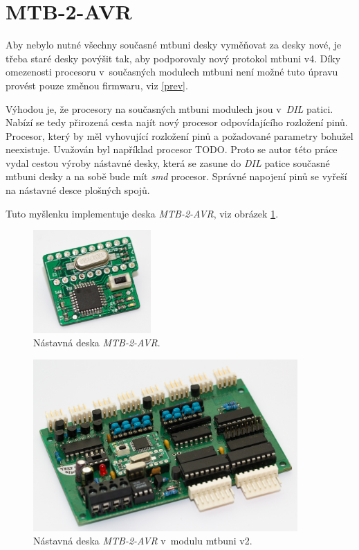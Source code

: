 \section{MTB-2-AVR} \label{sec:mtb-2-avr}

Aby nebylo nutné všechny současné \gls{mtbuni} desky vyměňovat za desky nové,
je třeba staré desky povýšit tak, aby podporovaly nový protokol \gls{mtbuni} v4.
Díky omezenosti procesoru v~současných modulech \gls{mtbuni} není možné tuto
úpravu provést pouze změnou firmwaru, viz \ref{prev}.

Výhodou je, že procesory na současných \gls{mtbuni} modulech jsou
v~\textit{DIL} patici. Nabízí se tedy přirozená cesta najít nový procesor
odpovídajícího rozložení pinů. Procesor, který by měl vyhovující rozložení pinů
a požadované parametry bohužel neexistuje. Uvažován byl například procesor
TODO. Proto se autor této práce vydal cestou výroby nástavné desky, která se
zasune do \textit{DIL} patice současné \gls{mtbuni} desky a na sobě bude mít
\textit{smd} procesor.  Správné napojení pinů se vyřeší na nástavné desce
plošných spojů.

Tuto myšlenku implementuje deska \textit{MTB-2-AVR}, viz obrázek
\ref{fig:mtb-2-avr-alone}.

\begin{figure}[ht]
\includegraphics[width=0.4\textwidth]{data/uni-2-upgrade-alone.jpg}
\caption{Nástavná deska \textit{MTB-2-AVR}.}
\label{fig:mtb-2-avr-alone}
\end{figure}

\begin{figure}[ht]
\includegraphics[width=0.9\textwidth]{data/uni-2-upgrade-all.jpg}
\caption{Nástavná deska \textit{MTB-2-AVR} v~modulu \gls{mtbuni} v2.}
\label{fig:mtb-2-avr-inside}
\end{figure}

